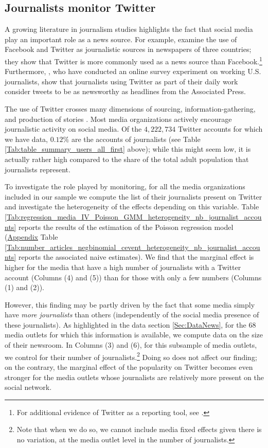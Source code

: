 \subsection{Journalists monitor Twitter}

 A growing literature in journalism studies highlights the fact that social media play an important role as a news source. For example, \citet{vonNordheimBoczekKoppers2018} examine the use of Facebook and Twitter as journalistic sources in newspapers of three countries; they show that Twitter is more commonly used as a news source than Facebook.\footnote{For additional evidence of Twitter as a reporting tool, see \citet{Vis2012}.} Furthermore, \citet{mcgregor_twitter_2018}, who have conducted an online survey experiment on working U.S. journalists, show that journalists using Twitter as part of their daily work consider tweets to be as newsworthy as headlines from the Associated Press.

The use of Twitter crosses many dimensions of sourcing, information-gathering, and production of stories \citep{Wihbeyetal2018}. Most media organizations actively encourage journalistic activity on social media. Of the $4,222,734$ Twitter accounts for which we have data, $0.12\%$ are the accounts of journalists (see Table \ref{Tab:table_summary_users_all_first} above); while this might seem low, it is actually rather high compared to the share of the total adult population that journalists represent.

To investigate the role played by monitoring, for all the media organizations included in our sample we compute the list of their journalists present on Twitter and investigate the heterogeneity of the effects depending on this variable. Table \ref{Tab:regression_media_IV_Poisson_GMM_heterogeneity_nb_journalist_accounts} reports the results of the estimation of the Poisson regression model (\hyperlink{ref:Appendix}{Appendix} Table \ref{Tab:number_articles_negbinomial_cevent_heterogeneity_nb_journalist_accounts} reports the associated naive estimates). We find that the marginal effect is higher for  the media that have a high number of journalists with a Twitter account (Columns (4) and (5)) than for those with only a few numbers (Columns (1) and (2)).

However, this finding may be partly driven by the fact that some media simply have \textit{more journalists} than others (independently of the social media presence of these journalists). As highlighted in the data section \ref{Sec:DataNews}, for the $68$ media outlets for which this information is available, we compute data on the size of their newsroom. In Columns (3) and (6), for this subsample of media outlets, we control for their number of journalists.\footnote{Note that when we do so, we cannot include media fixed effects given there is no variation, at the media outlet level in the number of journalists.} Doing so does not affect our finding; on the contrary, the marginal effect of the popularity on Twitter becomes even stronger for the media outlets whose journalists are relatively more present on the social network.


